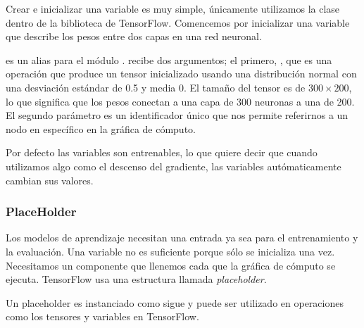 Crear e inicializar una variable es muy simple,
únicamente utilizamos la clase 
dentro de la biblioteca de TensorFlow.
Comencemos por inicializar una variable
que describe los pesos entre dos capas en una red neuronal.

\begin{sphinxVerbatim}[commandchars=\\\{\}]
  \PYG{p}{[} \PYG{p}{]} 
\end{sphinxVerbatim}

 es un alias para el módulo .
 recibe dos argumentos; el primero,
, que es una operación que
produce un tensor inicializado usando una
distribución normal con una desviación estándar de
0.5 y media 0. El tamaño del tensor es de $300 \times
200$, lo que significa que los pesos conectan a una
capa de 300 neuronas a una de 200. El segundo
parámetro es un identificador único que nos
permite referirnos a un nodo en específico en
la gráfica de cómputo.

Por defecto las variables son entrenables,
lo que quiere decir que cuando utilizamos algo
como el descenso del gradiente, las variables
autómaticamente cambian sus valores.


\subsubsection{PlaceHolder}

Los modelos de aprendizaje necesitan una entrada ya sea 
para el entrenamiento y la evaluación. Una variable no es 
suficiente porque sólo se inicializa una vez. Necesitamos un
componente que llenemos cada que la gráfica de cómputo se ejecuta.
TensorFlow usa una estructura llamada \textit{placeholder}. 

Un placeholder es instanciado como sigue y puede ser utilizado en operaciones como los tensores
y variables en TensorFlow.

